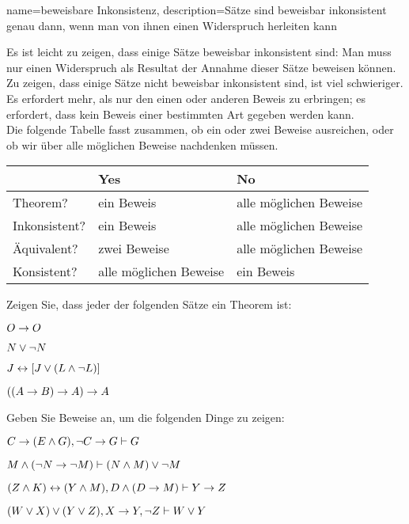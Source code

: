{    name=beweisbare Inkonsistenz, 
  description={Sätze sind beweisbar inkonsistent genau dann, wenn man von ihnen einen Widerspruch herleiten kann}
}

Es ist leicht zu zeigen, dass einige Sätze beweisbar inkonsistent sind: Man muss nur einen Widerspruch als Resultat der Annahme dieser Sätze beweisen können. Zu zeigen, dass einige Sätze nicht beweisbar inkonsistent sind, ist viel schwieriger. Es erfordert mehr, als nur den einen oder anderen Beweis zu erbringen; es erfordert, dass kein Beweis einer bestimmten Art gegeben werden kann.
\
\\
Die folgende Tabelle fasst zusammen, ob ein oder zwei Beweise ausreichen, oder ob wir über alle möglichen Beweise nachdenken müssen.
\begin{center}
\begin{tabular}{l l l}
 & \textbf{Yes} & \textbf{No}\\
 \hline
Theorem? & ein Beweis & alle möglichen Beweise\\
Inkonsistent? &  ein Beweis  & alle möglichen Beweise\\
Äquivalent? & zwei Beweise & alle möglichen Beweise\\
Konsistent? & alle möglichen Beweise & ein Beweis\\
\end{tabular}
\end{center}


\practiceproblems
\problempart
Zeigen Sie, dass jeder der folgenden Sätze ein Theorem ist:
\begin{earg}
\item $O \rightarrow O$
\item $N \vee \neg N$
\item $J \leftrightarrow [J\vee (L\wedge\neg L)]$
\item $((A \rightarrow B) \rightarrow A) \rightarrow A$ 
\end{earg}

\problempart
Geben Sie Beweise an, um die folgenden Dinge zu zeigen:
\begin{earg}
\item $C\rightarrow(E\wedge G), \neg C \rightarrow G \vdash G$
\item $M \wedge (\neg N \rightarrow \neg M) \vdash (N \wedge M) \vee \neg M$
\item $(Z\wedge K)\leftrightarrow(Y\wedge M), D\wedge(D\rightarrow M) \vdash Y\rightarrow Z$
\item $(W \vee X) \vee (Y \vee Z), X\rightarrow Y, \neg Z \vdash W\vee Y$
\end{earg}

